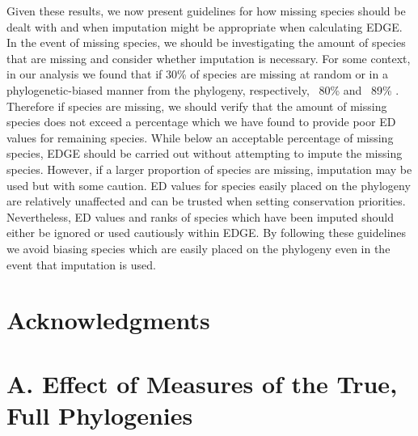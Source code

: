 \documentclass[12pt,english]{article}
\begin{document}
Given these results, we now present guidelines for how missing species should be
dealt with and when imputation might be appropriate when calculating EDGE. In
the event of missing species, we should be investigating the amount of species
that are missing and consider whether imputation is necessary.
For some context, in our analysis we found that if 30\% of species
are missing at random or in a phylogenetic-biased manner from the phylogeny,
respectively, ~80\% and ~89\% .
Therefore if species are missing, we should verify that the amount of missing
species does not exceed a percentage which we have found to provide poor ED
values for remaining species. While below an acceptable percentage of missing
species, EDGE should be carried out without attempting to impute the
missing species.
However, if a larger proportion of species are missing, imputation may
be used but with some caution. ED values for species easily placed on
the phylogeny are relatively unaffected and can be trusted when
setting conservation priorities. Nevertheless, ED values and ranks of
species which have been imputed should either be ignored or used
cautiously within EDGE.
By following these guidelines we avoid biasing species which are
easily placed on the phylogeny even in the event that imputation is
used.

\section*{Acknowledgments}

\clearpage
\printbibliography

\clearpage
\appendix
\section*{A. Effect of Measures of the True, Full Phylogenies}
\end{document}
